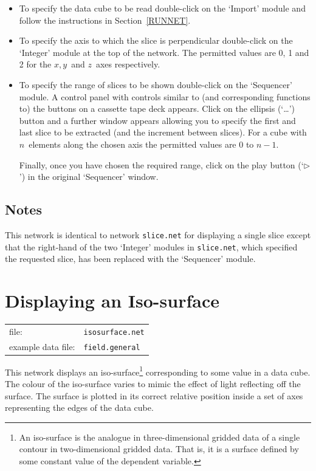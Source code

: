 \documentclass[twoside,11pt]{article}
\newcommand{\xlabel}[1]{}
\begin{document}
\begin{itemize}

  \item To specify the data cube to be read double-click on the `Import'
   module and follow the instructions in Section~\ref{RUNNET}.

  \item To specify the axis to which the slice is perpendicular
   double-click on the `Integer' module at the top of the network. The
   permitted values are 0, 1 and 2 for the $x, y$\, and $z$\, axes
   respectively.

  \item To specify the range of slices to be shown double-click on the
   `Sequencer' module. A control panel with controls similar to (and
   corresponding functions to) the buttons on a cassette tape deck
   appears. Click on the ellipsis (`\ldots') button and a further window
   appears allowing you to specify the first and last slice to be
   extracted (and the increment between slices). For a cube with $n$\,
   elements along the chosen axis the permitted values are 0 to $n-1$.

   Finally, once you have chosen the required range, click on the play
   button (`$\triangleright$') in the original `Sequencer' window.

\end{itemize}

\subsection{Notes}

This network is identical to network {\tt slice.net} for displaying
a single slice except that the right-hand of the two `Integer' modules
in {\tt slice.net}, which specified the requested slice, has been
replaced with the `Sequencer' module.


\newpage
\section{\xlabel{ISOSURFNET}Displaying an Iso-surface}


\begin{tabular}{ll}
file:              & {\tt isosurface.net} \\
example data file: & {\tt field.general}  \\
\end{tabular}

This network displays an iso-surface\footnote{An iso-surface is the
analogue in three-dimensional gridded data of a single contour in
two-dimensional gridded data. That is, it is a surface defined by some
constant value of the dependent variable.} corresponding to some value in
a data cube. The colour of the iso-surface varies to mimic the effect
of light reflecting off the surface. The surface is plotted in its
correct relative position inside a set of axes representing the edges
of the data cube.
\end{document}

